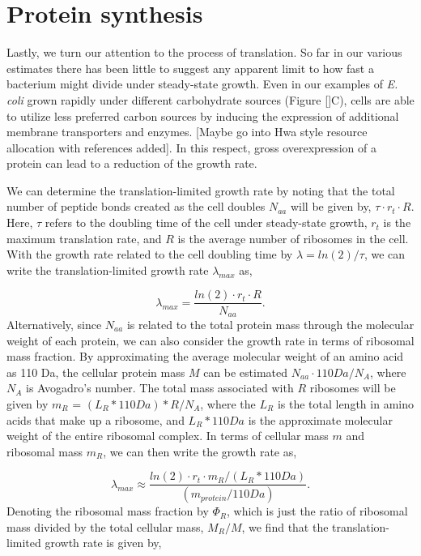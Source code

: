 \section{Protein synthesis}

Lastly, we turn our attention to the process of translation. So far in our
various estimates there has been little to suggest any apparent limit to how
fast a bacterium might divide under steady-state growth. Even in our examples of
\textit{E. coli} grown rapidly under different carbohydrate sources (Figure
[]C),  cells are able to utilize less preferred carbon sources by inducing the
expression of additional membrane transporters and enzymes. [Maybe go into Hwa
style resource allocation with references added]. In this respect, gross
overexpression of a protein can lead to a reduction of the growth rate.

We can determine the translation-limited growth rate by noting that the total
number of peptide bonds created as the cell doubles $N_{aa}$ will be given by,
$\tau \cdot r_t \cdot R$. Here, $\tau$ refers to the doubling time of the cell
under steady-state growth, $r_t$ is the maximum translation rate, and $R$ is the
average number of ribosomes in the cell. With the growth rate related to the
cell doubling time by $\lambda = ln(2)/\tau$, we can write the
translation-limited growth rate $\lambda_{max}$ as,

\begin{equation}
\lambda_{max} = \frac{ln(2) \cdot r_t \cdot R}{N_{aa}}.
\end{equation}
Alternatively, since $N_{aa}$ is related to the total protein mass through the
molecular weight of each protein, we can also consider the growth rate in terms
of ribosomal mass fraction. By approximating the average molecular weight of an
amino acid as 110 Da, the cellular protein mass $M$ can be estimated $N_{aa}
\cdot 110 Da / N_A$, where $N_A$ is Avogadro's number. The total mass associated
with $R$ ribosomes will be given by $m_R$ = $(L_R * 110 Da) * R / N_A$,  where
the $L_R$ is the total length in amino acids that make up a ribosome,  and $L_R
* 110 Da$ is the approximate molecular weight of the entire ribosomal complex. In terms of
cellular mass $m$ and ribosomal mass $m_R$, we can then write the growth rate as,

\begin{equation}
\lambda_{max} \approx \frac{ln(2) \cdot r_t \cdot m_R/(L_R * 110 Da) }{(m_{protein}/110 Da)}.
\end{equation}
Denoting the ribosomal mass fraction
by $\Phi_R$, which is just the ratio of ribosomal mass divided by the total cellular mass,
$M_R/M$, we find that the translation-limited growth rate is given by,

